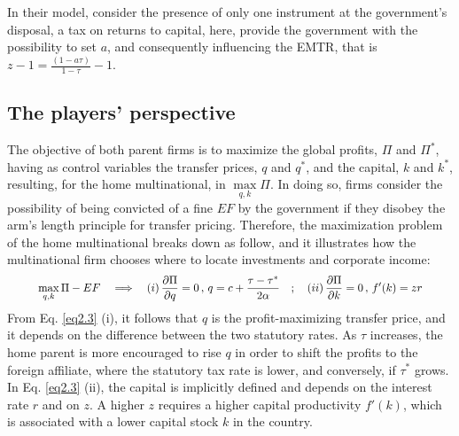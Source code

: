 In their model, \textcite{zo-mi-86} consider the presence of only one instrument at the government's disposal, a tax on returns to capital, here, \textcite{dev-loc-red-08} provide the government with the possibility to set $a$, and consequently influencing the EMTR, that is $z-1=\frac{(1-a\tau)}{1-\tau}-1$.
\vspace{-6pt}
\subsection{The players' perspective}
The objective of both parent firms is to maximize the global profits, $\Pi$ and $\Pi^*$, having as control variables the transfer prices, $q$ and $q^*$, and the capital, $k$ and $k^*$, resulting, for the home multinational, in $\max\limits_{q, k} \Pi$. In doing so, firms consider the possibility of being convicted of a fine $EF$ by the government if they disobey the arm's length principle for transfer pricing. Therefore, the maximization problem of the home multinational breaks down as follow, and it illustrates how the multinational firm chooses where to locate investments and corporate income:
\begin{align}\label{eq2.3}
        \scalemath{0.9}{\max\limits_{q, k}\Pi-EF \quad \Longrightarrow \quad (i)\, \frac{\partial \Pi}{\partial q}=0\, , \, q=c+\frac{\tau-\tau^*}{2\alpha}\quad ; \quad (ii)\, \frac{\partial \Pi}{\partial k}=0\, , \, f'(k)=zr}
\end{align}
From Eq. \ref{eq2.3} (i), it follows that $q$ is the profit-maximizing transfer price, and it depends on the difference between the two statutory rates. As $\tau$ increases, the home parent is more encouraged to rise $q$ in order to shift the profits to the foreign affiliate, where the statutory tax rate is lower, and conversely, if $\tau^*$ grows. In Eq. \ref{eq2.3} (ii), the capital is implicitly defined and depends on the interest rate $r$ and on $z$. A higher $z$ requires a higher capital productivity $f'(k)$, which is associated with a lower capital stock $k$ in the country.

